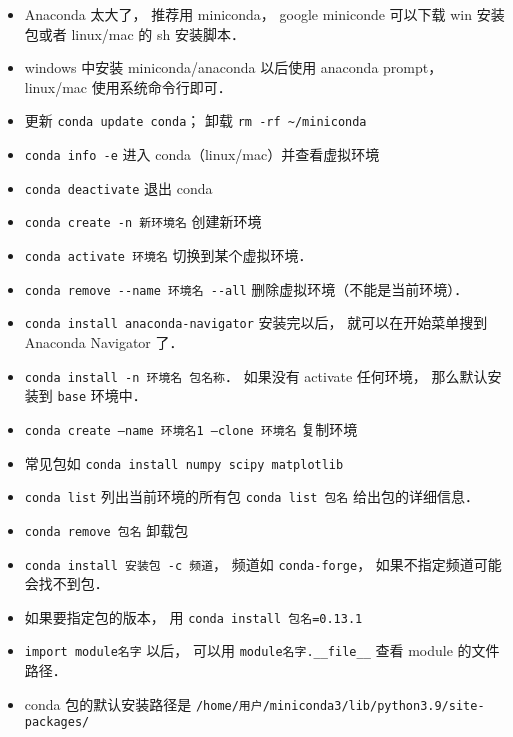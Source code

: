 
\begin{itemize}
\item Anaconda 太大了， 推荐用 miniconda， google miniconde 可以下载 win 安装包或者 linux/mac 的 sh 安装脚本．
\item windows 中安装 miniconda/anaconda 以后使用 anaconda prompt， linux/mac 使用系统命令行即可．
\item 更新 \verb|conda update conda|； 卸载 \verb|rm -rf ~/miniconda|
\item \verb|conda info -e| 进入 conda（linux/mac）并查看虚拟环境
\item \verb|conda deactivate| 退出 conda
\item \verb|conda create -n 新环境名| 创建新环境
\item \verb|conda activate 环境名| 切换到某个虚拟环境．
\item \verb|conda remove --name 环境名 --all| 删除虚拟环境（不能是当前环境）．
\item \verb|conda install anaconda-navigator| 安装完以后， 就可以在开始菜单搜到 Anaconda Navigator 了．
\item \verb|conda install -n 环境名 包名称|． 如果没有 activate 任何环境， 那么默认安装到 \verb|base| 环境中．
\item \verb|conda create —name 环境名1 —clone 环境名| 复制环境
\item 常见包如 \verb|conda install numpy scipy matplotlib|
\item \verb|conda list| 列出当前环境的所有包 \verb|conda list 包名| 给出包的详细信息．
\item \verb|conda remove 包名| 卸载包
\item \verb|conda install 安装包 -c 频道|， 频道如 \verb|conda-forge|， 如果不指定频道可能会找不到包．
\item 如果要指定包的版本， 用 \verb|conda install 包名=0.13.1|
\item \verb|import module名字| 以后， 可以用 \verb|module名字.__file__| 查看 module 的文件路径．
\item conda 包的默认安装路径是 \verb|/home/用户/miniconda3/lib/python3.9/site-packages/|
\end{itemize}

